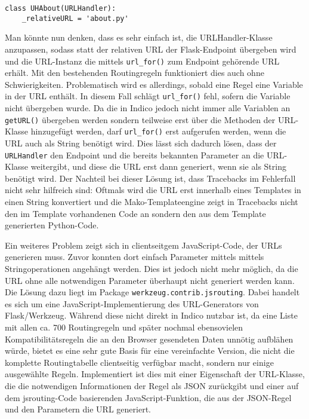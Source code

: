 \begin{lstlisting}[caption=URLHandler für about.py]
class UHAbout(URLHandler):
    _relativeURL = 'about.py'
\end{lstlisting}

Man könnte nun denken, dass es sehr einfach ist, die URLHandler-Klasse anzupassen, sodass statt der
relativen URL der Flask-Endpoint übergeben wird und die URL-Instanz die mittels
\lstinline{url_for()} zum Endpoint gehörende URL erhält. Mit den bestehenden Routingregeln
funktioniert dies auch ohne Schwierigkeiten. Problematisch wird es allerdings, sobald eine Regel eine
Variable in der URL enthält. In diesem Fall schlägt \lstinline{url_for()} fehl, sofern die Variable
nicht übergeben wurde. Da die in Indico jedoch nicht immer alle Variablen an \lstinline{getURL()}
übergeben werden sondern teilweise erst über die Methoden der URL-Klasse hinzugefügt werden, darf
\lstinline{url_for()} erst aufgerufen werden, wenn die URL auch als String benötigt wird. Dies lässt
sich dadurch lösen, dass der \lstinline{URLHandler} den Endpoint und die bereits bekannten Parameter
an die URL-Klasse weitergibt, und diese die URL erst dann generiert, wenn sie als String benötigt
wird. Der Nachteil bei dieser Lösung ist, dass Tracebacks im Fehlerfall nicht sehr hilfreich sind:
Oftmals wird die URL erst innerhalb eines Templates in einen String konvertiert und die
Mako-Templateengine zeigt in Tracebacks nicht den im Template vorhandenen Code an sondern den aus
dem Template generierten Python-Code.

Ein weiteres Problem zeigt sich in clientseitgem JavaScript-Code, der URLs generieren muss. Zuvor
konnten dort einfach Parameter mittels mittels Stringoperationen angehängt werden. Dies ist jedoch
nicht mehr möglich, da die URL ohne alle notwendigen Parameter überhaupt nicht generiert werden
kann. Die Lösung dazu liegt im Package \lstinline{werkzeug.contrib.jsrouting}. Dabei handelt es sich
um eine JavaScript-Implementierung des URL-Generators von Flask/Werkzeug. Während diese nicht direkt
in Indico nutzbar ist, da eine Liste mit allen ca. 700 Routingregeln und später nochmal ebensovielen
Kompatibilitätsregeln die an den Browser gesendeten Daten unnötig aufblähen würde, bietet es eine
sehr gute Basis für eine vereinfachte Version, die nicht die komplette Routingtabelle clientseitig
verfügbar macht, sondern nur einige ausgewählte Regeln. Implementiert ist dies mit einer Eigenschaft
der URL-Klasse, die die notwendigen Informationen der Regel als JSON zurückgibt und einer auf dem
jsrouting-Code basierenden JavaScript-Funktion, die aus der JSON-Regel und den Parametern die URL
generiert.

